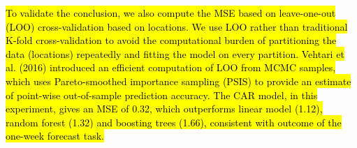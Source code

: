 \hl{To validate the conclusion, we also compute the MSE based on leave-one-out (LOO) cross-validation based on locations.
We use LOO rather than traditional K-fold cross-validation to avoid the computational burden of partitioning the data (locations) repeatedly and fitting the model on every partition.
Vehtari et al. (2016) introduced an efficient computation of LOO from MCMC samples,
which uses Pareto-smoothed importance sampling (PSIS) to provide an estimate
of point-wise out-of-sample prediction accuracy.
The CAR model, in this experiment, gives an MSE of 0.32, which outperforms linear model (1.12), random forest (1.32) and boosting
trees (1.66), consistent with outcome of the one-week forecast task.}









